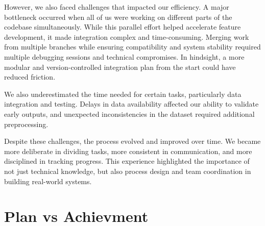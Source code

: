 However, we also faced challenges that impacted our efficiency. A major bottleneck occurred when all of us were working on different parts of the codebase simultaneously. While this parallel effort helped accelerate feature development, it made integration complex and time-consuming. Merging work from multiple branches while ensuring compatibility and system stability required multiple debugging sessions and technical compromises. In hindsight, a more modular and version-controlled integration plan from the start could have reduced friction.

We also underestimated the time needed for certain tasks, particularly data integration and testing. Delays in data availability affected our ability to validate early outputs, and unexpected inconsistencies in the dataset required additional preprocessing.

Despite these challenges, the process evolved and improved over time. We became more deliberate in dividing tasks, more consistent in communication, and more disciplined in tracking progress. This experience highlighted the importance of not just technical knowledge, but also process design and team coordination in building real-world systems.

\section{Plan vs Achievment}


